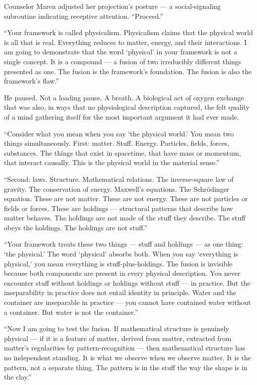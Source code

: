 Counselor Maren adjusted her projection's posture — a social-signaling subroutine indicating receptive attention. \enquote{Proceed.}

\enquote{Your framework is called physicalism. Physicalism claims that the physical world is all that is real. Everything reduces to matter, energy, and their interactions. I am going to demonstrate that the word \enquote*{physical} in your framework is not a single concept. It is a compound — a fusion of two irreducibly different things presented as one. The fusion is the framework's foundation. The fusion is also the framework's flaw.}

He paused. Not a loading pause. A breath. A biological act of oxygen exchange that was also, in ways that no physiological description captured, the felt quality of a mind gathering itself for the most important argument it had ever made.

\enquote{Consider what you mean when you say \enquote*{the physical world.} You mean two things simultaneously. First: matter. Stuff. Energy. Particles, fields, forces, substances. The things that exist in spacetime, that have mass or momentum, that interact causally. This is the physical world in the material sense.}

\enquote{Second: laws. Structure. Mathematical relations. The inverse-square law of gravity. The conservation of energy. Maxwell's equations. The Schrödinger equation. These are not matter. These are not energy. These are not particles or fields or forces. These are holdings — structural patterns that describe how matter behaves. The holdings are not made of the stuff they describe. The stuff obeys the holdings. The holdings are not stuff.}

\enquote{Your framework treats these two things — stuff and holdings — as one thing: \enquote*{the physical.} The word \enquote*{physical} absorbs both. When you say \enquote*{everything is physical,} you mean everything is stuff-plus-holdings. The fusion is invisible because both components are present in every physical description. You never encounter stuff without holdings or holdings without stuff — in practice. But the inseparability in practice does not entail identity in principle. Water and the container are inseparable in practice — you cannot have contained water without a container. But water is not the container.}

\enquote{Now I am going to test the fusion. If mathematical structure is genuinely physical — if it is a feature of matter, derived from matter, extracted from matter's regularities by pattern-recognition — then mathematical structure has no independent standing. It is what we observe when we observe matter. It is the pattern, not a separate thing. The pattern is in the stuff the way the shape is in the clay.}

